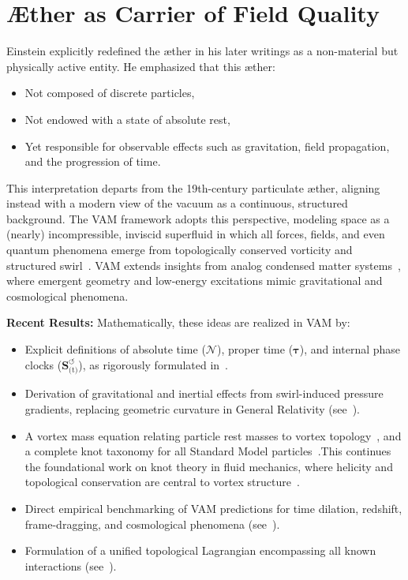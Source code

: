 \section{Æther as Carrier of Field Quality}

Einstein explicitly redefined the æther in his later writings as a non-material but physically active entity. He emphasized that this æther:
\begin{itemize}
    \item Not composed of discrete particles,
    \item Not endowed with a state of absolute rest,
    \item Yet responsible for observable effects such as gravitation, field propagation, and the progression of time.
\end{itemize}

This interpretation departs from the 19th-century particulate æther, aligning instead with a modern view of the vacuum as a continuous, structured
background. The VAM framework adopts this perspective, modeling space as a (nearly) incompressible, inviscid superfluid in which all forces, fields, and even quantum phenomena emerge from topologically conserved vorticity and structured swirl~\cite{VAM-8, VAM-1, VAM-2}. VAM extends insights from analog condensed matter systems~\cite{volovik2003universe}, where emergent geometry and low-energy excitations mimic gravitational and cosmological phenomena.


\vspace{0.7em}
\noindent\textbf{Recent Results:}
Mathematically, these ideas are realized in VAM by:
\begin{itemize}
    \item Explicit definitions of absolute time (\(\boldsymbol{\mathcal{N}}\)), proper time (\(\boldsymbol{\tau}\)), and internal phase clocks (\(\boldsymbol{S}^{\boldsymbol{\circlearrowleft}}_\text{(t)}\)), as rigorously formulated in~\cite{VAM-8, VAM-1}.
    \item Derivation of gravitational and inertial effects from swirl-induced pressure gradients, replacing geometric curvature in General Relativity (see~\cite{VAM-2, VAM-3, VAM-8}).
    \item A vortex mass equation relating particle rest masses to vortex topology~\cite{widnall1973vortexrings}, and a complete knot taxonomy for all Standard Model particles~\cite{VAM-8, VAM-11}.This continues the foundational work on knot theory in fluid mechanics, where helicity and topological conservation are central to vortex structure~\cite{knot_theroy_in_fluid}.

    \item Direct empirical benchmarking of VAM predictions for time dilation, redshift, frame-dragging, and cosmological phenomena (see~\cite{VAM-3, VAM-8}).
    \item Formulation of a unified topological Lagrangian encompassing all known interactions (see~\cite{VAM-14}).
\end{itemize}

